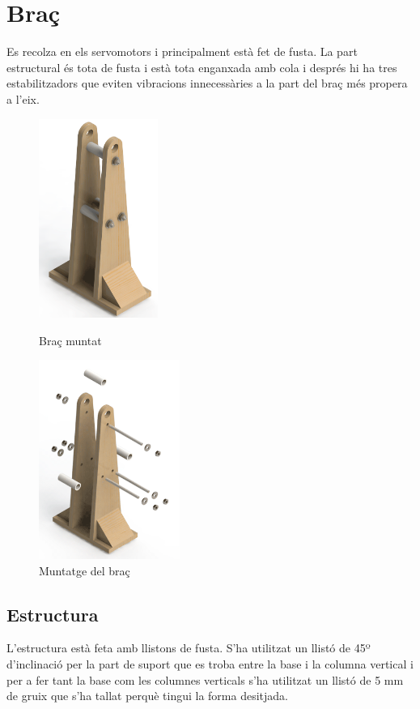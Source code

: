 \documentclass[a4paper, 12pt]{article}
\begin{document}
\newpage
\section{Braç}
Es recolza en els servomotors i principalment està fet de fusta. La part estructural és tota de fusta i està tota enganxada amb cola i després hi ha tres estabilitzadors que eviten vibracions innecessàries a la part del braç més propera a l'eix. 

\begin{figure}[h!]
\begin{minipage}[b]{0.45\linewidth}
\centering
\includegraphics[height=6.5cm]{./imgComp/brac}
\caption{Braç muntat}
\end{minipage}
\begin{minipage}[b]{0.45\linewidth}
\centering
\includegraphics[height=6.5cm]{./imgComp/brac_expl}
\caption{Muntatge del braç}
\end{minipage}
\end{figure}

\subsection{Estructura}
L'estructura està feta amb llistons de fusta. S'ha utilitzat un llistó de 45º d'inclinació per la part de suport que es troba entre la base i la columna vertical i per a fer tant la base com les columnes verticals s'ha utilitzat un llistó de 5 mm de gruix que s'ha tallat perquè tingui la forma desitjada. 
\end{document}
